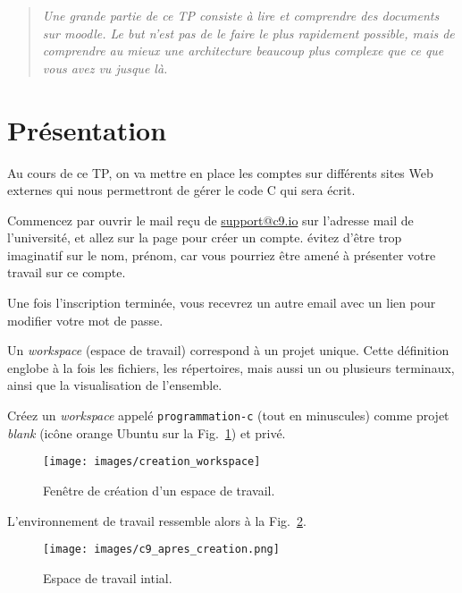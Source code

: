 \titre{\tgit}

\begin{quotation}
  \sl Une grande partie de ce TP consiste à lire et comprendre des
  documents sur moodle. Le but n'est pas de le faire le plus
  rapidement possible, mais de comprendre au mieux une architecture
  beaucoup plus complexe que ce que vous avez vu jusque là.
\end{quotation}

\section*{Présentation}

Au cours de ce TP, on va mettre en place les comptes sur différents
sites Web externes qui nous permettront de gérer le code C qui sera
écrit.


\question Commencez par ouvrir le mail reçu de \url{support@c9.io} sur
l'adresse mail de l'université, et allez sur la page pour créer un
compte. évitez d'être trop imaginatif sur le nom, prénom, car vous
pourriez être amené à présenter votre travail sur ce compte.

\question Une fois l'inscription terminée, vous recevrez un autre
email avec un lien pour modifier votre mot de passe.

Un \emph{workspace} (espace de travail) correspond à un projet
unique. Cette définition englobe à la fois les fichiers, les
répertoires, mais aussi un ou plusieurs terminaux, ainsi que la
visualisation de l'ensemble. 

\question Créez un \emph{workspace} appelé \texttt{programmation-c} (tout
en minuscules) comme projet \emph{blank} (icône orange Ubuntu
sur la Fig.~\ref{fig:workspace:creation}) et privé.

\begin{figure}[htbp]
  \centering
  \texttt{[image: images/creation\_workspace]}
  \caption{Fenêtre de création d'un espace de travail.}
  \label{fig:workspace:creation}
\end{figure}

L'environnement de travail ressemble alors à la Fig.~\ref{fig:workspace:initial}.

\begin{figure}[htbp]
  \centering
  \texttt{[image: images/c9\_apres\_creation.png]}
  \caption{Espace de travail intial.}
  \label{fig:workspace:initial}
\end{figure}

